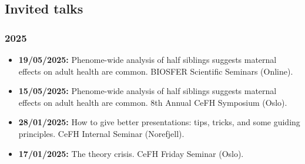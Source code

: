 \documentclass[10pt,a4paper]{article}
\begin{document}
\subsection*{Invited talks}
\subsubsection*{2025}
\begin{itemize}
\item \textbf{19/05/2025:} Phenome-wide analysis of half siblings suggests maternal effects on adult health are common. BIOSFER Scientific Seminars (Online).
\item \textbf{15/05/2025:} Phenome-wide analysis of half siblings suggests maternal effects on adult health are common. 8th Annual CeFH Symposium (Oslo).
\item \textbf{28/01/2025:} How to give better presentations: tips, tricks, and some guiding principles. CeFH Internal Seminar (Norefjell).
\item \textbf{17/01/2025:} The theory crisis. CeFH Friday Seminar (Oslo).
\end{itemize}
\end{document}
